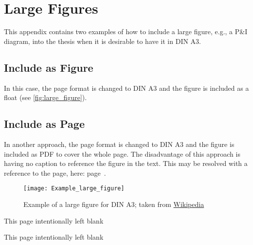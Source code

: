 \chapter{Large Figures}
This appendix contains two examples of how to include a large figure, e.g., a P\&I diagram, into the thesis when it is desirable to have it in DIN A3.
\section{Include as Figure}
In this case, the page format is changed to DIN A3 and the figure is included as a float (see \autoref{fig:large_figure}).
\section{Include as Page}
In another approach, the page format is changed to DIN A3 and the figure is included as PDF to cover the whole page. The disadvantage of this approach is having no caption to reference the figure in the text. This may be resolved with a reference to the page, here: page~\pageref{page:large_figure_2.1}.
\cleardoublepage
{}
\recalctypearea
\begin{figure}
\centering
\texttt{[image: Example\_large\_figure]}
\caption{Example of a large figure for DIN A3; taken from \href{https://de.wikipedia.org/wiki/Datei:P\%26ID.JPG}{Wikipedia}}\label{fig:large_figure}
\end{figure}
\clearpage
\thispagestyle{empty}
\vspace*{0.33\textheight}
\begin{dedication_env}
This page intentionally left blank
\end{dedication_env}
\cleardoublepage

\clearpage
\thispagestyle{empty}
\vspace*{0.33\textheight}
\begin{dedication_env}
This page intentionally left blank
\end{dedication_env}
\cleardoublepage
{}
\recalctypearea